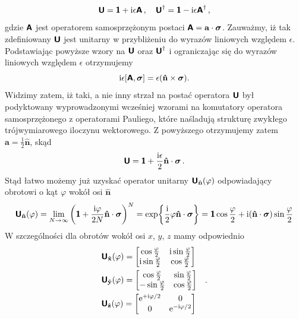 \documentclass{myclass}
\begin{document}
\begin{equation*}
    \boldsymbol{\mathsf{U}} = \boldsymbol{\mathsf{1}} + \mathrm{i}\epsilon\boldsymbol{\mathsf{A}}\,,\quad \boldsymbol{\mathsf{U}}^\dagger = \boldsymbol{\mathsf{1}} - \mathrm{i}\epsilon\boldsymbol{\mathsf{A}}^\dagger\,,
\end{equation*}
gdzie \(\boldsymbol{\mathsf{A}}\) jest operatorem samosprzężonym postaci \(\boldsymbol{\mathsf{A}} =
\mathbf{a}\cdot\boldsymbol{\sigma}\). Zauważmy, iż tak zdefiniowany \(\boldsymbol{\mathsf{U}}\) jest unitarny w
przybliżeniu do wyrazów liniowych względem \(\epsilon\). Podstawiając powyższe wzory na \(\boldsymbol{\mathsf{U}}\)
oraz \(\boldsymbol{\mathsf{U}}^\dagger\) i ograniczając się do wyrazów liniowych względem \(\epsilon\) otrzymujemy
\begin{equation*}
    \mathrm{i}\epsilon[\boldsymbol{\mathsf{A}}, \boldsymbol{\sigma}] = \epsilon(\mathbf{\hat{n}}\times\boldsymbol{\sigma}).
\end{equation*}
Widzimy zatem, iż taki, a nie inny strzał na postać operatora \(\boldsymbol{\mathsf{U}}\) był podyktowany
wyprowadzonymi wcześniej wzorami na komutatory operatora samosprzężonego z operatorami Pauliego,
które naśladują strukturę zwykłego trójwymiarowego iloczynu wektorowego. Z powyższego otrzymujemy
zatem \(\mathbf{a} = \frac{1}{2}\mathbf{\hat{n}}\), skąd
\begin{equation*}
    \boldsymbol{\mathsf{U}} = \boldsymbol{\mathsf{1}} + \frac{\mathrm{i} \epsilon}{2} \mathbf{\hat{n}} \cdot \boldsymbol{\sigma}\,.
\end{equation*}
Stąd łatwo możemy już uzyskać operator unitarny \(\boldsymbol{\mathsf{U}}_\mathbf{\hat{n}}(\varphi)\) odpowiadający
obrotowi o kąt \(\varphi\) wokół osi \(\mathbf{\hat{n}}\)
\begin{equation*}
    \boldsymbol{\mathsf{U}}_\mathbf{\hat{n}}(\varphi) = \lim_{N\to\infty}\left(\boldsymbol{\mathsf{1}} + \frac{\mathrm{i} \varphi}{2N} \mathbf{\hat{n}} \cdot \boldsymbol{\sigma}\right)^N = \exp{\frac{\mathrm{i}}{2}\varphi\mathbf{\hat{n}}\cdot\boldsymbol{\sigma}} = \boldsymbol{\mathsf{1}}\cos\frac{\varphi}{2} + \mathrm{i}(\mathbf{\hat{n}}\cdot\boldsymbol{\sigma})\sin\frac{\varphi}{2}
\end{equation*}
W szczególności dla obrotów wokół osi \(x\), \(y\), \(z\) mamy odpowiednio
\begin{equation*}
    \begin{split}
        &\oper{U}_\mathbf{\hat{x}}(\varphi) = \mqty[\cos\frac{\varphi}{2} & \im\sin\frac{\varphi}{2} \\ \im\sin\frac{\varphi}{2} & \cos\frac{\varphi}{2}]\\
        &\oper{U}_\mathbf{\hat{y}}(\varphi) = \mqty[\cos\frac{\varphi}{2} & \sin\frac{\varphi}{2} \\ -\sin\frac{\varphi}{2} & \cos\frac{\varphi}{2}]\\
        &\oper{U}_\mathbf{\hat{z}}(\varphi) = \mqty[\e^{+\im\varphi/2} & 0 \\ 0 & \e^{-\im\varphi/2}]
    \end{split}\quad.
\end{equation*}
\end{document}
